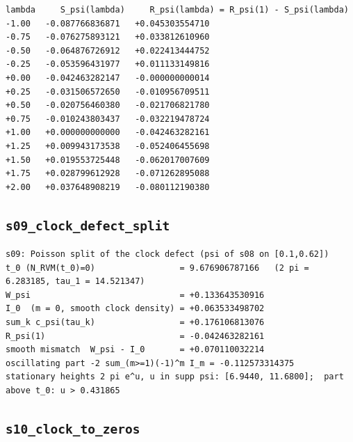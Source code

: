 \documentclass[11pt,reqno]{amsart}
\numberwithin{equation}{section}
\theoremstyle{plain}
\theoremstyle{definition}
\theoremstyle{remark}
\begin{document}
\begin{lstlisting}[style=out]
 lambda     S_psi(lambda)     R_psi(lambda) = R_psi(1) - S_psi(lambda)
-1.00   -0.087766836871   +0.045303554710
-0.75   -0.076275893121   +0.033812610960
-0.50   -0.064876726912   +0.022413444752
-0.25   -0.053596431977   +0.011133149816
+0.00   -0.042463282147   -0.000000000014
+0.25   -0.031506572650   -0.010956709511
+0.50   -0.020756460380   -0.021706821780
+0.75   -0.010243803437   -0.032219478724
+1.00   +0.000000000000   -0.042463282161
+1.25   +0.009943173538   -0.052406455698
+1.50   +0.019553725448   -0.062017007609
+1.75   +0.028799612928   -0.071262895088
+2.00   +0.037648908219   -0.080112190380
\end{lstlisting}

\subsection{\texttt{s09\_clock\_defect\_split}}
\label{app:out-s09-clock-defect-split}

\begin{lstlisting}[style=out]
s09: Poisson split of the clock defect (psi of s08 on [0.1,0.62])
t_0 (N_RVM(t_0)=0)                 = 9.676906787166   (2 pi = 6.283185, tau_1 = 14.521347)
W_psi                              = +0.133643530916
I_0  (m = 0, smooth clock density) = +0.063533498702
sum_k c_psi(tau_k)                 = +0.176106813076
R_psi(1)                           = -0.042463282161
smooth mismatch  W_psi - I_0       = +0.070110032214
oscillating part -2 sum_(m>=1)(-1)^m I_m = -0.112573314375
stationary heights 2 pi e^u, u in supp psi: [6.9440, 11.6800];  part above t_0: u > 0.431865
\end{lstlisting}

\subsection{\texttt{s10\_clock\_to\_zeros}}
\label{app:out-s10-clock-to-zeros}
\end{document}
